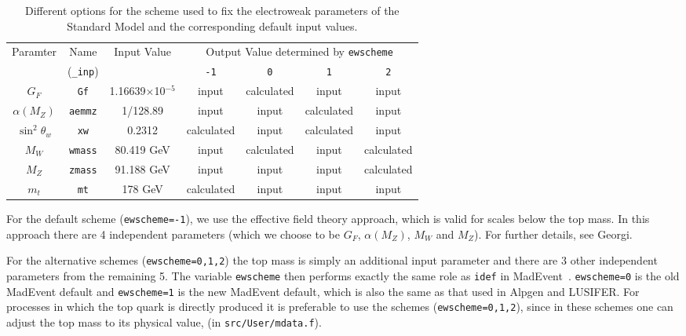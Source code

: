 \documentclass[12pt]{article}
\begin{document}
\begin{table}
\begin{center}
\begin{tabular}{|c|c|c|c|c|c|c|} \hline
 Paramter & Name & Input Value
 & \multicolumn{4}{c|}{Output Value determined by \tt ewscheme} \\
\cline{4-7}
& ({\tt \_inp}) & & {\tt -1} & {\tt 0} & {\tt 1} & {\tt 2} \\ \hline
$G_F$            & {\tt Gf}      & 1.16639$\times$10$^{-5}$ 
 & input & calculated & input & input \\
$\alpha(M_Z)$    & {\tt aemmz}   & 1/128.89                 
 & input & input & calculated & input \\
$\sin^2 \theta_w$& {\tt xw}      & 0.2312               
 & calculated & input & calculated & input \\
$M_W$            & {\tt wmass}   & 80.419 GeV                
 & input & calculated & input & calculated \\
$M_Z$            & {\tt zmass}   & 91.188 GeV               
 & input & input & input & calculated \\
$m_t$            & {\tt mt}      & 178 GeV                  
 & calculated & input & input & input \\
\hline
\end{tabular}
\caption{Different options for the scheme used to fix the electroweak
parameters of the Standard Model and the corresponding default input
values.}
\label{ewscheme}
\end{center}
\end{table}

For the default scheme ({\tt ewscheme=-1}), we use the effective field
theory approach, which is valid for scales below the top mass. In this
approach there are 4 independent parameters (which we choose to be
$G_F$, $\alpha(M_Z)$, $M_W$ and $M_Z$). For further details,
see Georgi\cite{Georgi:1991ci}.

For the alternative schemes ({\tt ewscheme=0,1,2}) the top mass is simply
an additional input parameter and there are 3 other independent
parameters from the remaining 5. The variable {\tt ewscheme} then performs
exactly the same role as {\tt idef} in MadEvent~\cite{Maltoni:2002qb}.
{\tt ewscheme=0} is the old MadEvent default and {\tt ewscheme=1} is the
new MadEvent default, which is also the same as that used in Alpgen and
LUSIFER. For processes in which the top quark is directly produced  it is 
preferable to use  the schemes ({\tt ewscheme=0,1,2}), since in these schemes
one can adjust the top mass to its physical value, (in {\tt src/User/mdata.f}).
\end{document}
